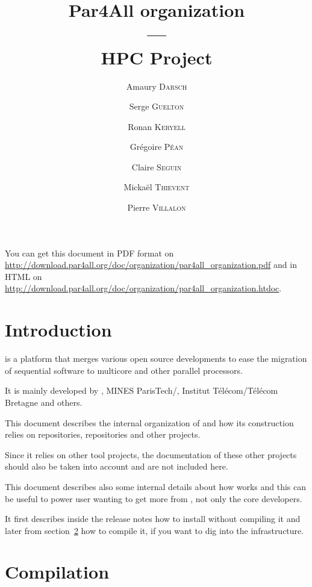\documentclass[a4paper]{article}
\newcommand{\LINK}[1]{\url{#1}\xspace}
\newcommand{\PfaOrganizationPDF}{\LINK{http://download.par4all.org/doc/organization/par4all_organization.pdf}}
\newcommand{\PfaAllOrganizationHTDOC}{\LINK{http://download.par4all.org/doc/organization/par4all_organization.htdoc}}
\begin{document}
\title{Par4All organization\\
  ---\\
  HPC Project}

\author{Amaury \textsc{Darsch} \and Serge \textsc{Guelton} \and Ronan
  \textsc{Keryell} \and Grégoire \textsc{Péan} \and Claire \textsc{Seguin}
  \and Mickaël \textsc{Thievent} \and Pierre \textsc{Villalon}}

\maketitle

You can get this document in PDF format on \PfaOrganizationPDF and in HTML
on \PfaAllOrganizationHTDOC.


\section{Introduction}
\label{sec:introduction}

\Apfa is a platform that merges various open source developments to ease
the migration of sequential software to multicore and other parallel
processors.

It is mainly developed by \Ahpcp, MINES ParisTech/\Acri, Institut
Télécom/Télécom Bretagne and others.

This document describes the internal organization of \Apfa and how its
construction relies on \Agit repositories, \Asvn repositories and other
projects.

Since it relies on other tool projects, the documentation of these other
projects should also be taken into account and are not included here.

This document describes also some internal details about how \Apfa works
and this can be useful to power user wanting to get more from \Apfa, not
only the \Apfa core developers.

It first describes inside the release notes how to install \Apfa without
compiling it and later from section~\ref{sec:compilation} how to compile
it, if you want to dig into the infrastructure.

\tableofcontents{}

\bigskip{}




\section{Compilation}
\label{sec:compilation}
\end{document}
